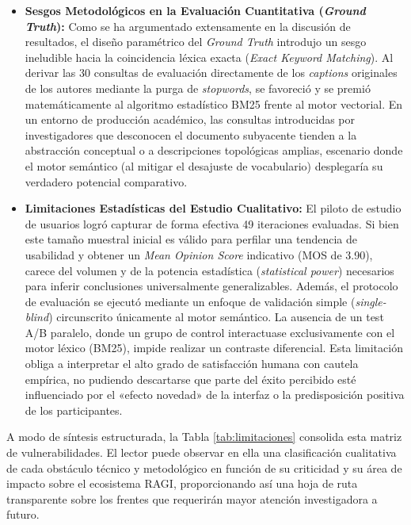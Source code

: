 \documentclass[a4paper]{report}
\begin{document}
\begin{itemize}
    \item \textbf{Sesgos Metodológicos en la Evaluación Cuantitativa (\textit{Ground Truth}):} Como se ha argumentado extensamente en la discusión de resultados, el diseño paramétrico del \textit{Ground Truth} introdujo un sesgo ineludible hacia la coincidencia léxica exacta (\textit{Exact Keyword Matching}). Al derivar las 30 consultas de evaluación directamente de los \textit{captions} originales de los autores mediante la purga de \textit{stopwords}, se favoreció y se premió matemáticamente al algoritmo estadístico BM25 frente al motor vectorial. En un entorno de producción académico, las consultas introducidas por investigadores que desconocen el documento subyacente tienden a la abstracción conceptual o a descripciones topológicas amplias, escenario donde el motor semántico (al mitigar el desajuste de vocabulario) desplegaría su verdadero potencial comparativo.

    \item \textbf{Limitaciones Estadísticas del Estudio Cualitativo:} El piloto de estudio de usuarios logró capturar de forma efectiva 49 iteraciones evaluadas. Si bien este tamaño muestral inicial es válido para perfilar una tendencia de usabilidad y obtener un \textit{Mean Opinion Score} indicativo (MOS de 3.90), carece del volumen y de la potencia estadística (\textit{statistical power}) necesarios para inferir conclusiones universalmente generalizables. Además, el protocolo de evaluación se ejecutó mediante un enfoque de validación simple (\textit{single-blind}) circunscrito únicamente al motor semántico. La ausencia de un test A/B paralelo, donde un grupo de control interactuase exclusivamente con el motor léxico (BM25), impide realizar un contraste diferencial. Esta limitación obliga a interpretar el alto grado de satisfacción humana con cautela empírica, no pudiendo descartarse que parte del éxito percibido esté influenciado por el «efecto novedad» de la interfaz o la predisposición positiva de los participantes.
\end{itemize}

A modo de síntesis estructurada, la Tabla \ref{tab:limitaciones} consolida esta matriz de vulnerabilidades. El lector puede observar en ella una clasificación cualitativa de cada obstáculo técnico y metodológico en función de su criticidad y su área de impacto sobre el ecosistema RAGI, proporcionando así una hoja de ruta transparente sobre los frentes que requerirán mayor atención investigadora a futuro.
\end{document}
